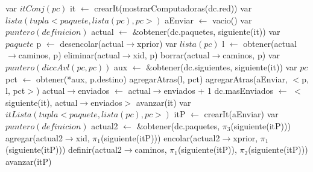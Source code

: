 \newpage
\begin{algorithm}\phantom{[H]}
\begin{algorithmic}[1]
 
  \State var $itConj(pc)$ it $\gets$ crearIt(mostrarComputadoras(dc.red)) 
  \State var $lista(tupla<paquete, lista(pc), pc>)$ aEnviar $\gets$ vacio() 
   
    \State var $puntero(definicion)$ actual $\gets$ $\&$obtener(dc.paquetes, siguiente(it)) 
     
      \State var $paquete$ p $\gets$ desencolar(actual$\rightarrow$xprior) 
      \State var $lista(pc)$ l $\gets$ obtener(actual$\rightarrow$caminos, p) 
      \State eliminar(actual$\rightarrow$xid, p) 
      \State borrar(actual$\rightarrow$caminos, p) 
      \State var $puntero(diccAvl(pc, pc))$ aux $\gets$ $\&$obtener(dc.siguientes, siguiente(it)) 
      \State var $pc$ pct $\gets$ obtener(*aux, p.destino) 
        \State agregarAtras(l, pct) 
        \State agregarAtras(aEnviar, $<$p, l, pct$>$) 
      \EndIf
      \State actual$\rightarrow$enviados $\gets$ actual$\rightarrow$enviados + 1  
       
        \State dc.masEnviados $\gets$ $<$siguiente(it), actual$\rightarrow$enviados$>$ 
      \EndIf      
    \EndIf
    \State avanzar(it) 
  \EndWhile
  \State var $itLista(tupla<paquete, lista(pc), pc>)$ itP $\gets$ crearIt(aEnviar) 
   
    \State var $puntero(definicion)$ actual2 $\gets$ $\&$obtener(dc.paquetes, $\pi_{3}$(siguiente(itP))) 
    \State agregar(actual2$\rightarrow$xid, $\pi_{1}$(siguiente(itP))) 
    \State encolar(actual2$\rightarrow$xprior, $\pi_{1}$(siguiente(itP))) 
    \State definir(actual2$\rightarrow$caminos, $\pi_{1}$(siguiente(itP)), $\pi_{2}$(siguiente(itP))) 
    \State avanzar(itP) 
  \EndWhile
\EndFunction
\end{algorithmic}
\end{algorithm}

